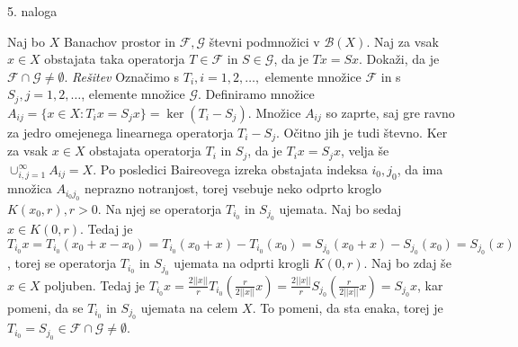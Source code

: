 \documentclass[a4paper, 12pt]{article}
\begin{document}
\begin{flushleft}
5. naloga
\end{flushleft}
Naj bo $X$ Banachov prostor in $\mathcal{F}, \mathcal{G}$ števni podmnožici v $\mathcal{B}(X)$. Naj za vsak $x\in X$ obstajata taka operatorja $T\in \mathcal{F}$ in $S\in \mathcal{G}$, da je $Tx = Sx$. Dokaži, da je $\mathcal{F} \cap \mathcal{G} \neq \emptyset$.
\newline
\emph{Rešitev}
\newline
Označimo s $T_i, i=1,2,\dots,$ elemente množice $\mathcal{F}$ in s $S_j, j=1,2,\dots$, elemente množice $\mathcal{G}$. Definiramo množice $A_{ij} = \{x\in X: T_i x = S_jx\} = \ker(T_i - S_j)$. Množice $A_{ij}$ so zaprte, saj gre ravno za jedro omejenega linearnega operatorja $T_i-S_j$. Očitno jih je tudi števno. Ker za vsak $x\in X$ obstajata operatorja $T_i$ in $S_j$, da je $T_i x = S_j x$, velja še $\cup_{i,j=1}^{\infty} A_{ij} = X$. Po posledici Baireovega izreka obstajata indeksa $i_0, j_0$, da ima množica $A_{i_0 j_0}$ neprazno notranjost, torej vsebuje neko odprto kroglo $K(x_0,r),r>0$. Na njej se operatorja $T_{i_0}$ in $S_{j_0}$ ujemata. Naj bo sedaj $x\in K(0,r)$. Tedaj je $T_{i_0} x = T_{i_0}(x_0 + x - x_0)= T_{i_0} (x_0 + x) - T_{i_0}(x_0)= S_{j_0}(x_0+x)-S_{j_0}(x_0) = S_{j_0}(x)$, torej se operatorja $T_{i_0}$ in $S_{j_0}$ ujemata na odprti krogli $K(0,r)$. Naj bo zdaj še $x\in X$ poljuben. Tedaj je $T_{i_0}x = \frac{2||x||}{r}T_{i_0}(\frac{r}{2||x||}x) =\frac{2||x||}{r}S_{j_0}(\frac{r}{2||x||}x) = S_{j_0}x$, kar pomeni, da se $T_{i_0}$ in $S_{j_0}$ ujemata na celem $X$. To pomeni, da sta enaka, torej je $T_{i_0} = S_{j_0}\in \mathcal{F}\cap \mathcal{G}\neq \emptyset$. 
\end{document}
